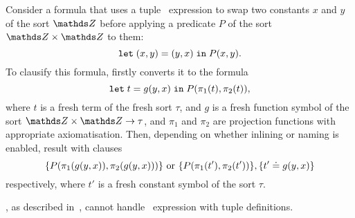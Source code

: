 \begin{example*} Consider a formula that uses a tuple \LETIN\ expression to swap two constants $x$ and $y$ of the sort $\Z$ before applying a predicate $P$ of the sort $\Z \times \Z$ to them:
\begin{equation*}\label{eq:tuple-let-example}
  \mathtt{let}\;{(x,y)}={(y,x)}\;\allowbreak\mathtt{in}\;{P(x,y)}.
\end{equation*}
To clausify this formula, \nfcnf{} firstly converts it to the formula $$\mathtt{let}\;{t}={g(y,x)}\;\allowbreak\mathtt{in}\;{P(\pi_1(t), \pi_2(t))},$$ where $t$ is a fresh term of the fresh sort $\tau$, and $g$ is a fresh function symbol of the sort $\Z \times \Z \to \tau$, and $\pi_1$ and $\pi_2$ are projection functions with appropriate axiomatisation. Then, depending on whether inlining or naming is enabled, \nfcnf{} result with clauses $$\{P(\pi_1(g(y,x)),\pi_2(g(y,x)))\} \text{~or~} \{P(\pi_1(t'),\pi_2(t'))\}, \{t' \doteq g(y,x)\}$$ respectively, where $t'$ is a fresh constant symbol of the sort $\tau$.
\QED\end{example*}

\oldcnf{}, as described in~\cite{FOOL}, cannot handle \LETIN\ expression with tuple definitions.